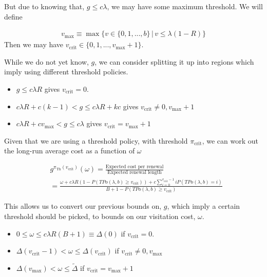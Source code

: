 \documentclass[a4paper,10pt]{article}
\theoremstyle{definition}
\theoremstyle{definition}
\theoremstyle{remark}
\theoremstyle{definition}
\begin{document}
But due to knowing that, $g \leq c \lambda$, we may have some maximum threshold. We will define

\begin{align*}
v_{\text{max}} \equiv \max \{ v \in \{0,1,...,b \} \, | \, v \leq \lambda (1-R) \}
\end{align*}
Then we may have $v_{\text{crit}} \in \{0,1,...,v_{\text{max}}+1 \}$.

While we do not yet know, $g$, we can consider splitting it up into regions which imply using different threshold policies.

\begin{itemize}
\item $g \leq c \lambda R$ gives $v_{\text{crit}}=0$.

\item $c \lambda R +c(k-1) < g \leq c \lambda R + kc$ gives $v_{\text{crit}} \neq 0,v_{\text{max}}+1$

\item $c \lambda R + c v_{\text{max}} < g \leq c \lambda$ gives $v_{\text{crit}}=v_{\text{max}}+1$
\end{itemize}

Given that we are using a threshold policy, with threshold $\pi_{\text{crit}}$, we can work out the long-run average cost as a function of $\omega$

\begin{align*}
&g^{\pi_{\text{Th}}(v_{\text{crit}})}(\omega)=\frac{\text{Expected cost per renewal}}{\text{Expected renewal length}} \\
&= \frac{\omega + c \lambda R (1-P(TPo(\lambda,b) \geq v_{\text{crit}})) + c \sum\limits_{i=0}^{v_{\text{crit}}-1} i P(TPo(\lambda,b)=i)}{B+1-P(TPo(\lambda,b) \geq v_{\text{crit}})}
\end{align*}

This allows us to convert our previous bounds on, $g$, which imply a  certain threshold should be picked, to bounds on our visitation cost, $\omega$.

\begin{itemize}
\item $0 \leq \omega \leq c \lambda R (B+1) \equiv \Delta(0)$ if $v_{\text{crit}}=0$.

\item $\Delta(v_{\text{crit}}-1) < \omega \leq  \Delta(v_{\text{crit}})$ if $v_{\text{crit}} \neq 0,v_{\text{max}}$

\item $\Delta(v_{\text{max}}) < \omega \leq \widetilde{\Delta}$ if $v_{\text{crit}}=v_{\text{max}}+1$
\end{itemize}
\end{document}
